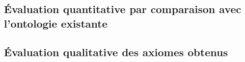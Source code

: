 

\subsection{Évaluation quantitative par comparaison avec l'ontologie existante}





\subsection{Évaluation qualitative des axiomes obtenus}

%
%
%
%
%